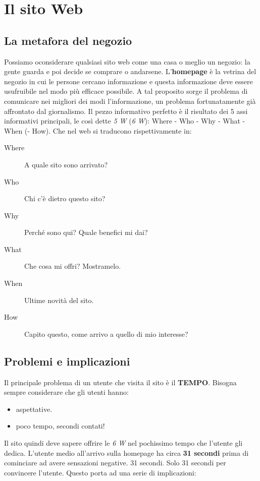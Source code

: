 
\chapter{Il sito Web}

	\section{La metafora del negozio}
		Possiamo oconsiderare qualsiasi sito web come una casa o meglio un negozio: la gente guarda e poi decide se comprare o andarsene.
		L'\textbf{homepage} è la vetrina del negozio in cui le persone cercano informazione e questa informazione deve essere usufruibile nel modo più efficace possibile. A tal proposito sorge il problema di comunicare nei migliori dei modi l'informazione, un problema fortunatamente già affrontato dal giornalismo. Il pezzo informativo perfetto è il risultato dei 5 assi informativi principali, le così dette \emph{5 W} (\emph{6 W}): Where - Who - Why - What - When (- How).
		Che nel web si traducono rispettivamente in:
		\begin{description}
			\item[Where] A quale sito sono arrivato?
			\item[Who] Chi c'è dietro questo sito?
			\item[Why] Perché sono qui? Quale benefici mi dai?
			\item[What] Che cosa mi offri? Mostramelo.
			\item[When] Ultime novità del sito.
			\item[How] Capito questo, come arrivo a quello di mio interesse?
		\end{description}
	
	\section{Problemi e implicazioni}
		Il principale problema di un utente che visita il sito è il \textbf{TEMPO}. Bisogna sempre considerare che gli utenti hanno:
			\begin{itemize}
				\item aspettative.
				\item poco tempo, secondi contati!
			\end{itemize}
		Il sito quindi deve sapere offrire le \emph{6 W} nel pochissimo tempo che l'utente gli dedica.	L'utente medio all'arrivo sulla homepage ha circa \textbf{31 secondi} prima di cominciare ad avere sensazioni negative. 31 secondi. Solo 31 secondi per convincere l'utente. Questo porta ad una serie di implicazioni:
		
